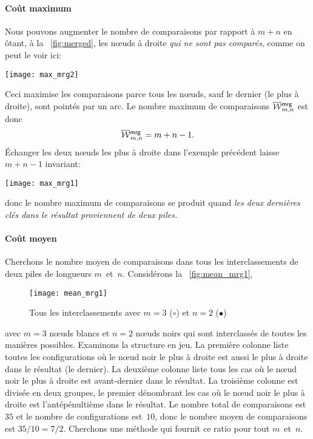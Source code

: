 \paragraph{Coût maximum}

Nous pouvons augmenter le nombre de comparaisons par rapport à \(m+n\)
en ôtant, à la \fig~\vref{fig:merged}, les n{\oe}uds à droite
\emph{qui ne sont pas comparés}, comme on peut le voir ici:
\begin{center}
\texttt{[image: max\_mrg2]}
\end{center}
Ceci maximise les comparaisons parce tous les n{\oe}uds, sauf le
dernier (le plus à droite), sont pointés par un arc. Le nombre maximum
de comparaisons
\(\OW{\fun{mrg}}{m,n}\) est donc
\begin{equation}
\OW{\fun{mrg}}{m,n} = m + n - 1.\label{eq:worst_merge}
\end{equation}
Échanger les deux n{\oe}uds les plus à droite dans l'exemple précédent
laisse \(m+n-1\) invariant:
\begin{center}
\texttt{[image: max\_mrg1]}
\end{center}
donc le nombre maximum de comparaisons se produit quand \emph{les deux
  dernières clés dans le résultat proviennent de deux piles.}


\paragraph{Coût moyen}

Cherchons le nombre moyen de comparaisons dans tous les
interclassements de deux piles de longueurs
\(m\)~et~\(n\). Considérons la \fig~\vref{fig:mean_mrg1},
\begin{figure}[b]
\centering
\texttt{[image: mean\_mrg1]}
\caption{Tous les interclassements avec \(m=3\) (\(\circ\)) et \(n=2\)
  (\(\bullet\))}
\label{fig:mean_mrg1}
\end{figure}
avec \(m=3\) n{\oe}uds blancs et \(n=2\) n{\oe}uds noirs qui sont
interclassés de toutes les manières possibles. Examinons la structure
en jeu. La première colonne liste toutes les configurations où le
n{\oe}ud noir le plus à droite est aussi le plus à droite dans le
résultat (le dernier). La deuxième colonne liste tous les cas où le
n{\oe}ud noir le plus à droite est avant-dernier dans le résultat. La
troisième colonne est divisée en deux groupes, le premier dénombrant
les cas où le n{\oe}ud noir le plus à droite est l'antépénultième dans
le résultat. Le nombre total de comparaisons est~\(35\) et le nombre
de configurations est~\(10\), donc le nombre moyen de comparaisons est
\(35/10 = 7/2\).\label{seven_two} Cherchons une méthode qui fournit ce
ratio pour tout \(m\)~et~\(n\).

